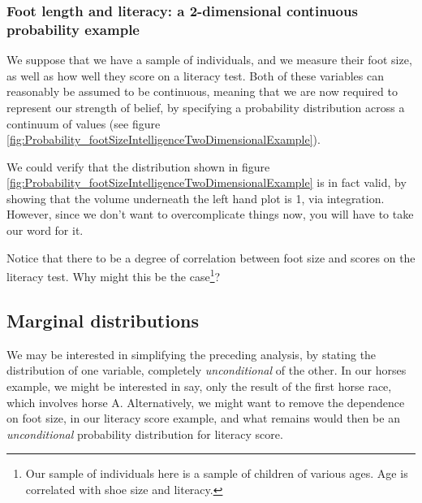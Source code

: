 \documentclass[11pt,fullpage]{book}
\begin{document}
\subsubsection{Foot length and literacy: a 2-dimensional continuous probability example}
We suppose that we have a sample of individuals, and we measure their foot size, as well as how well they score on a literacy test. Both of these variables can reasonably be assumed to be continuous, meaning that we are now required to represent our strength of belief, by specifying a probability distribution across a continuum of values (see figure \ref{fig:Probability_footSizeIntelligenceTwoDimensionalExample}). 


We could verify that the distribution shown in figure \ref{fig:Probability_footSizeIntelligenceTwoDimensionalExample} is in fact valid, by showing that the volume underneath the left hand plot is 1, via integration. However, since we don't want to overcomplicate things now, you will have to take our word for it.

Notice that there to be a degree of correlation between foot size and scores on the literacy test. Why might this be the case\footnote{Our sample of individuals here is a sample of children of various ages. Age is correlated with shoe size and literacy.}?

\subsection{Marginal distributions}\label{sec:Probability_marginal}
We may be interested in simplifying the preceding analysis, by stating the distribution of one variable, completely \textit{unconditional} of the other. In our horses example, we might be interested in say, only the result of the first horse race, which involves horse A. Alternatively, we might want to remove the dependence on foot size, in our literacy score example, and what remains would then be an \textit{unconditional} probability distribution for literacy score.
\end{document}
